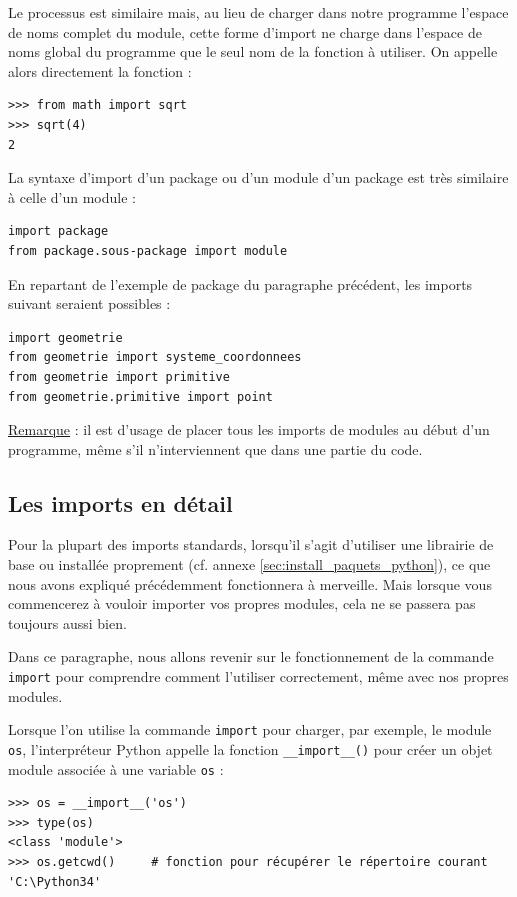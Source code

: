 \documentclass[12pt, a4paper]{article}
\begin{document}
Le processus est similaire mais, au lieu de charger dans notre programme l'espace de noms complet du module, cette forme d'import ne charge dans l'espace de noms global du programme que le seul nom de la fonction à utiliser. On appelle alors directement la fonction :
\begin{lstlisting}
>>> from math import sqrt
>>> sqrt(4)
2
\end{lstlisting}

La syntaxe d'import d'un package ou d'un module d'un package est très similaire à celle d'un module :
\begin{lstlisting}
import package
from package.sous-package import module
\end{lstlisting}

En repartant de l'exemple de package du paragraphe précédent, les imports suivant seraient possibles :
\begin{lstlisting}
import geometrie
from geometrie import systeme_coordonnees
from geometrie import primitive
from geometrie.primitive import point
\end{lstlisting}

\underline{Remarque} : il est d'usage de placer tous les imports de modules au début d'un programme, même s'il n'interviennent que dans une partie du code.


\subsection{Les imports en détail}
Pour la plupart des imports standards, lorsqu'il s'agit d'utiliser une librairie de base ou installée proprement (cf. annexe \ref{sec:install_paquets_python}), ce que nous avons expliqué précédemment fonctionnera à merveille. Mais lorsque vous commencerez à vouloir importer vos propres modules, cela ne se passera pas toujours aussi bien.

Dans ce paragraphe, nous allons revenir sur le fonctionnement de la commande \lstinline{import} pour comprendre comment l'utiliser correctement, même avec nos propres modules.

Lorsque l'on utilise la commande \lstinline{import} pour charger, par exemple, le module \lstinline{os}, l'interpréteur Python appelle la fonction \lstinline{__import__()} pour créer un objet module associée à une variable \lstinline{os} :
\begin{lstlisting}
>>> os = __import__('os')
>>> type(os)
<class 'module'>
>>> os.getcwd()		# fonction pour récupérer le répertoire courant
'C:\Python34'
\end{lstlisting} 
\end{document}
